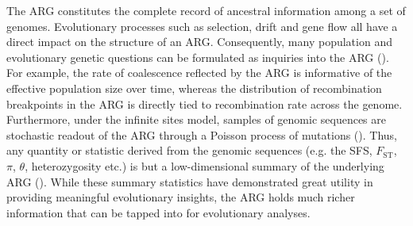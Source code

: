 The \ac{ARG} constitutes the complete record of ancestral information among a set of genomes. Evolutionary processes such as selection, drift and gene flow all have a direct impact on the structure of an \ac{ARG}. Consequently, many population and evolutionary genetic questions can be formulated as inquiries into the \ac{ARG} (\cite{rasmussen_genome-wide_2014,lewanski2023era}). For example, the rate of coalescence reflected by the \ac{ARG} is informative of the effective population size over time, whereas the distribution of recombination breakpoints in the \ac{ARG} is directly tied to recombination rate across the genome. Furthermore, under the infinite sites model, samples of genomic sequences are stochastic readout of the \ac{ARG} through a Poisson process of mutations (\cite{wakeley2005coalescent}). Thus, any quantity or statistic derived from the genomic sequences (e.g. the \acs{SFS}, $F_{\mathrm{ST}}$, $\pi$, $\theta$, heterozygosity etc.) is but a low-dimensional summary of the underlying \ac{ARG} (\cite{ralph2020efficiently}). While these summary statistics have demonstrated great utility in providing meaningful evolutionary insights, the \ac{ARG} holds much richer information that can be tapped into for evolutionary analyses.


